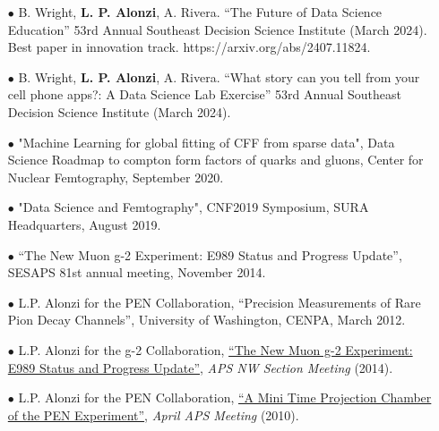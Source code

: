 \documentclass{article}[10pt]
\begin{document}
\begin{itemize}

\item [$\bullet$] B. Wright, {\bf L. P. Alonzi}, A. Rivera. “The Future of Data Science Education” 53rd Annual Southeast Decision Science Institute (March 2024). Best paper in innovation track. https://arxiv.org/abs/2407.11824.

\item [$\bullet$] B. Wright, {\bf L. P. Alonzi}, A. Rivera. “What story can you tell from your cell phone apps?: A Data Science Lab Exercise” 53rd Annual Southeast Decision Science Institute (March 2024).


\item [$\bullet$] "Machine Learning for global fitting of CFF from sparse data", Data Science Roadmap to compton form factors of quarks and gluons, Center for Nuclear Femtography, September 2020.
\item [$\bullet$] "Data Science and Femtography", CNF2019 Symposium, SURA Headquarters, August 2019.
\item [$\bullet$] ``The New Muon g-2 Experiment: E989 Status and Progress Update'', SESAPS 81st annual meeting, November 2014.
\item [$\bullet$] L.P. Alonzi for the PEN Collaboration, ``Precision Measurements of Rare Pion Decay Channels'', University of Washington, CENPA, March 2012.
\item [$\bullet$] L.P. Alonzi for the g-2 Collaboration, \href{http://pen.phys.virginia.edu/lpa2a-docs/2014-05-02-Alonzi-APSNWSection.pdf}{``The New Muon g-2 Experiment: E989 Status and Progress Update''}, \emph{APS NW Section Meeting} (2014).
\item [$\bullet$] L.P. Alonzi for the PEN Collaboration, \href{http://pen.phys.virginia.edu/talks/2010_April_APS_alonzi.pdf}{``A Mini Time Projection Chamber of the PEN Experiment''}, \emph{April APS Meeting} (2010).


\end{itemize}
\end{document}
